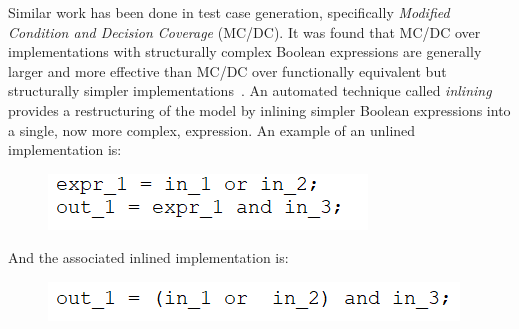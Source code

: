 
Similar work has been done in test case generation, specifically \emph{Modified Condition and Decision Coverage} (MC/DC). It was found that MC/DC over implementations with structurally complex Boolean expressions are generally larger and more effective than MC/DC over functionally equivalent but structurally simpler implementations~\cite{gay2016effect}. An automated technique called \emph{inlining} provides a restructuring of the model by inlining simpler Boolean expressions into a single, now more complex, expression. An example of an unlined implementation is: 

\begin{figure}[h]
	\begin{center}
		\includegraphics[scale=1.0]{images/uninlinedEx.PNG}
	\end{center}
	\vspace{-1.5em}
\end{figure}

And the associated inlined implementation is: 

\begin{figure}[h]
	\begin{center}
		\includegraphics[scale=1.0]{images/inlined.PNG}
	\end{center}
	\vspace{-1.5em}
\end{figure}

